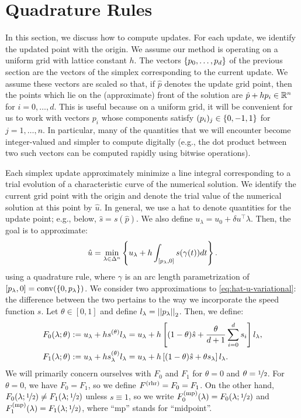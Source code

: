 \documentclass[eikonal.tex]{subfiles}
\begin{document}
\section{Quadrature Rules}

In this section, we discuss how to compute updates. For each update,
we identify the updated point with the origin. We assume our method is
operating on a uniform grid with lattice constant $h$. The vectors
$\left\{p_0, \hdots, p_d\right\}$ of the previous section are the vectors of
the simplex corresponding to the current update. We assume these
vectors are scaled so that, if $\hat{p}$ denotes the update grid
point, then the points which lie on the (approximate) front of the
solution are $\hat{p} + h p_i \in \mathbb{R}^n$ for $i = 0, \hdots, d$. This
is useful because on a uniform grid, it will be convenient for us to
work with vectors $p_i$ whose components satisfy
$(p_i)_j \in \left\{0, -1, 1\right\}$ for $j = 1, \hdots, n$. In particular,
many of the quantities that we will encounter become integer-valued
and simpler to compute digitally (e.g., the dot product between two
such vectors can be computed rapidly using bitwise operations).

Each simplex update approximately minimize a line integral
corresponding to a trial evolution of a characteristic curve of the
numerical solution. We identify the current grid point with the origin
and denote the trial value of the numerical solution at this point by
$\hat{u}$. In general, we use a hat to denote quantities for the
update point; e.g., below, $\hat{s} = s(\hat{p})$. We also define
$u_\lambda = u_0 + \delta u^\top \lambda$. Then, the goal is to
approximate:
\begin{align}\label{eq:hat-u-variational}
  \hat{u} = \min_{\lambda \in \Delta^n} \left\{u_\lambda + h \int_{[p_\lambda, 0]} s(\gamma(t))dt\right\}.
\end{align}
using a quadrature rule, where $\gamma$ is an arc length
parametrization of
$[p_\lambda, 0] = \operatorname{conv}(\left\{0, p_\lambda\right\})$. We
consider two approximations to \cref{eq:hat-u-variational}: the
difference between the two pertains to the way we incorporate the
speed function $s$. Let $\theta \in [0, 1]$ and define
$l_\lambda = \left|\left|p_\lambda\right|\right|_2$. Then, we define:
\begin{align*}
  F_0(\lambda; \theta) &:= u_\lambda + h s^{(\theta)} l_\lambda = u_\lambda + h \left[(1-\theta)\hat{s} + \frac{\theta}{d + 1} \sum_{i=0}^d s_i\right] l_\lambda, \\
  F_1(\lambda; \theta) &:= u_\lambda + h s^{(\theta)}_\lambda l_\lambda = u_\lambda + h \left[(1-\theta)\hat{s} + \theta s_\lambda\right] l_\lambda.
\end{align*}
We will primarily concern ourselves with $F_0$ and $F_1$ for
$\theta = 0$ and $\theta = \nicefrac{1}{2}$. For $\theta = 0$, we have
$F_0 = F_1$, so we define $F^{\operatorname{(rhr)}} = F_0 = F_1$. On the other hand,
$F_0(\lambda;\nicefrac{1}{2}) \neq F_1(\lambda;\nicefrac{1}{2})$
unless $s \equiv 1$, so we write
$F_0^{\operatorname{(mp)}}(\lambda) = F_0(\lambda; \nicefrac{1}{2})$ and
$F_1^{\operatorname{(mp)}}(\lambda) = F_1(\lambda; \nicefrac{1}{2})$, where ``mp''
stands for ``midpoint''.
\end{document}
